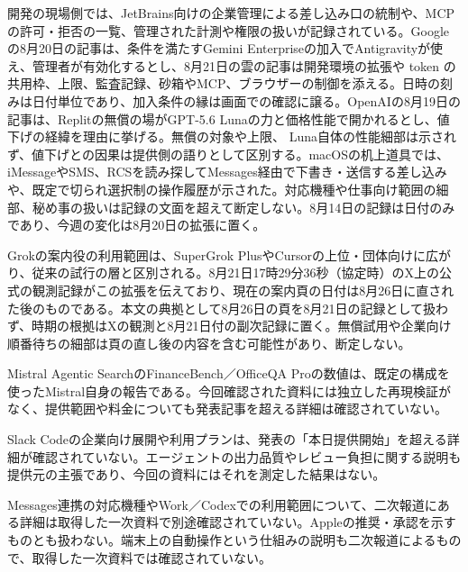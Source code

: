 \noindent 開発の現場側では、JetBrains向けの企業管理による差し込み口の統制や、MCPの許可・拒否の一覧、管理された計測や権限の扱いが記録されている。Googleの8月20日の記事は、条件を満たすGemini Enterpriseの加入でAntigravityが使え、管理者が有効化するとし、8月21日の雲の記事は開発環境の拡張や token の共用枠、上限、監査記録、砂箱やMCP、ブラウザーの制御を添える。日時の刻みは日付単位であり、加入条件の縁は画面での確認に譲る。OpenAIの8月19日の記事は、Replitの無償の場がGPT-5.6 Lunaの力と価格性能で開かれるとし、値下げの経緯を理由に挙げる。無償の対象や上限、 Luna自体の性能細部は示されず、値下げとの因果は提供側の語りとして区別する。macOSの机上道具では、iMessageやSMS、RCSを読み探してMessages経由で下書き・送信する差し込みや、既定で切られ選択制の操作履歴が示された。対応機種や仕事向け範囲の細部、秘め事の扱いは記録の文面を超えて断定しない。8月14日の記録は日付のみであり、今週の変化は8月20日の拡張に置く。 \cite{w2026w34w34eventc099,w2026w34w34eventc102,w2026w34w34eventrefreshopenaireplitgpt56luna,w2026w34w34eventc096,w2026w34w34eventc052}\par\medskip
\noindent Grokの案内役の利用範囲は、SuperGrok PlusやCursorの上位・団体向けに広がり、従来の試行の層と区別される。8月21日17時29分36秒（協定時）のX上の公式の観測記録がこの拡張を伝えており、現在の案内頁の日付は8月26日に直された後のものである。本文の典拠として8月26日の頁を8月21日の記録として扱わず、時期の根拠はXの観測と8月21日付の副次記録に置く。無償試用や企業向け順番待ちの細部は頁の直し後の内容を含む可能性があり、断定しない。 \cite{w2026w34w34eventc066}\par\medskip
\begin{claimboundary}
Mistral Agentic SearchのFinanceBench／OfficeQA Proの数値は、既定の構成を使ったMistral自身の報告である。今回確認された資料には独立した再現検証がなく、提供範囲や料金についても発表記事を超える詳細は確認されていない。
\end{claimboundary}
\begin{claimboundary}
Slack Codeの企業向け展開や利用プランは、発表の「本日提供開始」を超える詳細が確認されていない。エージェントの出力品質やレビュー負担に関する説明も提供元の主張であり、今回の資料にはそれを測定した結果はない。
\end{claimboundary}
\begin{claimboundary}
Messages連携の対応機種やWork／Codexでの利用範囲について、二次報道にある詳細は取得した一次資料で別途確認されていない。Appleの推奨・承認を示すものとも扱わない。端末上の自動操作という仕組みの説明も二次報道によるもので、取得した一次資料では確認されていない。
\end{claimboundary}
